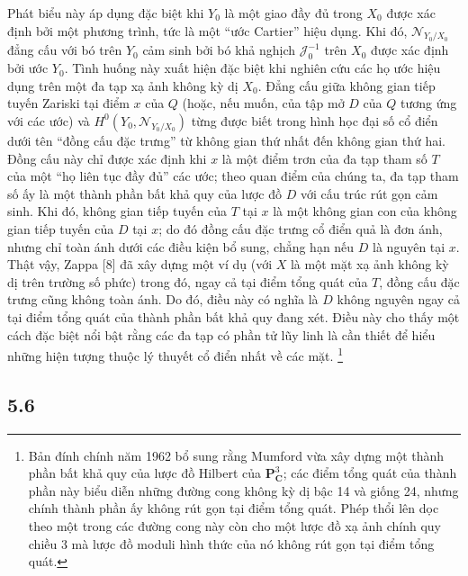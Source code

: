  Phát biểu này áp dụng đặc biệt khi $Y_0$ là một giao
đầy đủ trong $X_0$ được xác định bởi một phương trình, tức là một ``ước
Cartier'' hiệu dụng. Khi đó, $\mathcal N_{Y_0/X_0}$ đẳng cấu với bó trên $Y_0$
cảm sinh bởi bó khả nghịch $\mathcal J_0^{-1}$ trên $X_0$ được xác định bởi
ước $Y_0$. Tình huống này xuất hiện đặc biệt khi nghiên cứu các họ ước hiệu
dụng trên một đa tạp xạ ảnh không kỳ dị $X_0$. Đẳng cấu giữa không gian tiếp
tuyến Zariski tại điểm $x$ của $Q$ (hoặc, nếu muốn, của tập mở $D$ của $Q$
tương ứng với các ước) và $H^0(Y_0,\mathcal N_{Y_0/X_0})$ từng được biết trong
hình học đại số cổ điển dưới tên ``đồng cấu đặc trưng'' từ không gian thứ nhất
đến không gian thứ hai. Đồng cấu này chỉ được xác định khi $x$ là một điểm trơn
của đa tạp tham số $T$ của một ``họ liên tục đầy đủ'' các ước; theo quan điểm
của chúng ta, đa tạp tham số ấy là một thành phần bất khả quy của lược đồ $D$
với cấu trúc rút gọn cảm sinh. Khi đó, không gian tiếp tuyến của $T$ tại $x$ là
một không gian con của không gian tiếp tuyến của $D$ tại $x$; do đó đồng cấu
đặc trưng cổ điển quả là đơn ánh, nhưng chỉ toàn ánh dưới các điều kiện bổ
sung, chẳng hạn nếu $D$ là nguyên tại $x$. Thật vậy, Zappa [8] đã xây dựng
một ví dụ
(với $X$ là một mặt xạ ảnh không kỳ dị trên trường số phức) trong đó, ngay cả
tại điểm tổng quát của $T$, đồng cấu đặc trưng cũng không toàn ánh. Do đó, điều
này có nghĩa là $D$ không nguyên ngay cả tại điểm tổng quát của thành phần bất
khả quy đang xét. Điều này cho thấy một cách đặc biệt nổi bật rằng các đa tạp
có phần tử lũy linh là cần thiết để hiểu những hiện tượng thuộc lý thuyết cổ
điển nhất về các mặt.
\footnote{Bản đính chính năm 1962 bổ sung rằng Mumford vừa xây dựng một thành
phần bất khả quy của lược đồ Hilbert của $\mathbf P^3_{\mathbf C}$; các điểm
tổng quát của thành phần này biểu diễn những đường cong không kỳ dị bậc 14 và
giống 24, nhưng chính thành phần ấy không rút gọn tại điểm tổng quát. Phép
thổi lên dọc theo một trong các đường cong này còn cho một lược đồ xạ ảnh chính
quy chiều 3 mà lược đồ moduli hình thức của nó không rút gọn tại điểm tổng
quát.}

\subsection*{5.6}

